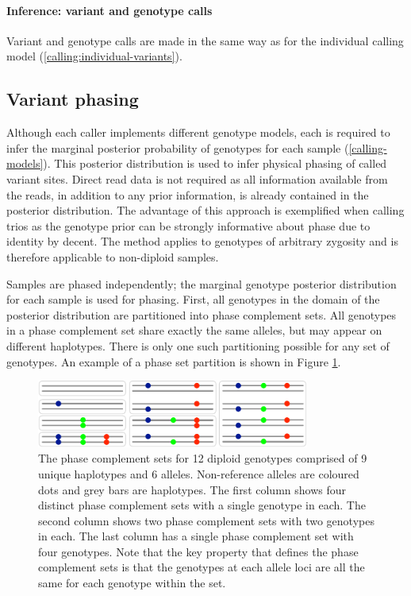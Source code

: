 \documentclass{article}
\begin{document}
\paragraph{Inference: variant and genotype calls}

Variant and genotype calls are made in the same way as for the individual calling model (\ref{calling:individual-variants}).

\subsection{Variant phasing}\label{phasing}

Although each caller implements different genotype models, each is required to infer the marginal posterior probability of genotypes for each sample (\ref{calling-models}). This posterior distribution is used to infer physical phasing of called variant sites. Direct read data is not required as all information available from the reads, in addition to any prior information, is already contained in the posterior distribution. The advantage of this approach is exemplified when calling trios as the genotype prior can be strongly informative about phase due to identity by decent. The method applies to genotypes of arbitrary zygosity and is therefore applicable to non-diploid samples.

Samples are phased independently; the marginal genotype posterior distribution for each sample is used for phasing. First, all genotypes in the domain of the posterior distribution are partitioned into phase complement sets. All genotypes in a phase complement set share exactly the same alleles, but may appear on different haplotypes. There is only one such partitioning possible for any set of genotypes. An example of a phase set partition is shown in Figure \ref{fig:phase-sets}.

\begin{figure}[ht]
    \centering
	\label{fig:phase-sets}
    \includegraphics[width=0.8\textwidth]{figures/phase-sets}
	\caption{The phase complement sets for 12 diploid genotypes comprised of 9 unique haplotypes and 6 alleles. Non-reference alleles are coloured dots and grey bars are haplotypes. The first column shows four distinct phase complement sets with a single genotype in each. The second column shows two phase complement sets with two genotypes in each. The last column has a single phase complement set with four genotypes. Note that the key property that defines the phase complement sets is that the genotypes at each allele loci are all the same for each genotype within the set.}
\end{figure}
\end{document}
